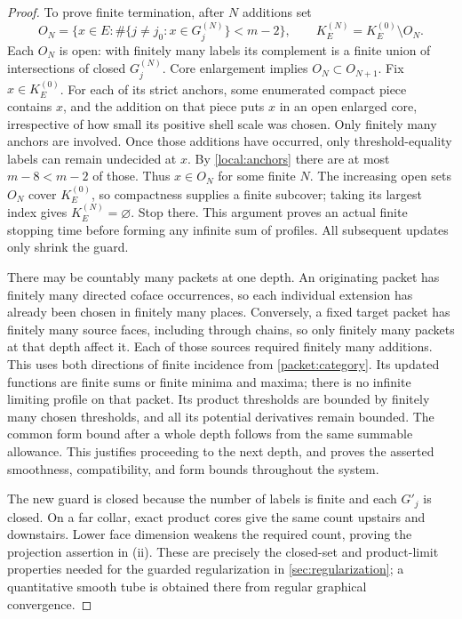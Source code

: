 \documentclass[11pt]{article}
\numberwithin{equation}{section}
\theoremstyle{definition}
\theoremstyle{remark}
\begin{document}
\begin{proof}
To prove finite termination, after $N$ additions set
\[
 O_N=\{x\in E:\#\{j\ne j_0:x\in G_j^{(N)}\}<m-2\},
 \qquad K_E^{(N)}=K_E^{(0)}\setminus O_N.
\]
Each $O_N$ is open: with finitely many labels its complement is a
finite union of intersections of closed $G_j^{(N)}$.  Core enlargement
implies $O_N\subset O_{N+1}$.  Fix $x\in K_E^{(0)}$.  For each of its
strict anchors, some enumerated compact piece contains $x$, and the
addition on that piece puts $x$ in an open enlarged core, irrespective
of how small its positive shell scale was chosen.  Only finitely many
anchors are involved.  Once those additions have occurred, only
threshold-equality labels can remain undecided at $x$.  By
\cref{local:anchors} there are at most $m-8<m-2$ of those.
Thus $x\in O_N$ for some finite $N$.  The increasing open sets $O_N$
cover $K_E^{(0)}$, so compactness supplies a finite subcover; taking
its largest index gives $K_E^{(N)}=\varnothing$.  Stop there.
This argument proves an actual finite stopping time before forming any
infinite sum of profiles.  All subsequent updates only shrink the guard.

There may be countably many packets at one depth.  An originating packet
has finitely many directed coface occurrences, so each individual
extension has already been chosen in finitely many places.  Conversely,
a fixed target packet has finitely many source faces, including through
chains, so only finitely many packets at that depth affect it.  Each of
those sources required finitely many additions.  This uses both
directions of finite incidence from \cref{packet:category}.
Its updated functions are finite sums or finite minima and maxima;
there is no infinite limiting profile on that packet.  Its product
thresholds are bounded by finitely many chosen thresholds, and all its
potential derivatives remain bounded.  The common form bound after a
whole depth follows from the same summable allowance.  This justifies
proceeding to the next depth, and proves the asserted smoothness,
compatibility, and form bounds throughout the system.

The new guard is closed because the number of labels is finite and
each $G'_j$ is closed.  On a far collar, exact product cores give the
same count upstairs and downstairs.  Lower face dimension weakens the
required count, proving the projection assertion in (ii).  These are
precisely the closed-set and product-limit properties needed for the
guarded regularization in \cref{sec:regularization}; a quantitative
smooth tube is obtained there from regular graphical convergence.


\end{proof}
\end{document}
